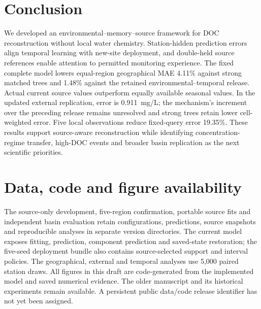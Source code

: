 \documentclass[11pt]{article}
\begin{document}
\section{Conclusion}
We developed an environmental--memory--source framework for DOC reconstruction without local water chemistry. Station-hidden prediction errors align temporal learning with new-site deployment, and double-held source references enable attention to permitted monitoring experience. The fixed complete model lowers equal-region geographical MAE 4.11\% against strong matched trees and 1.48\% against the retained environmental--temporal release. Actual current source values outperform equally available seasonal values. In the updated external replication, error is 0.911~mg/L; the mechanism's increment over the preceding release remains unresolved and strong trees retain lower cell-weighted error. Five local observations reduce fixed-query error 19.35\%. These results support source-aware reconstruction while identifying concentration-regime transfer, high-DOC events and broader basin replication as the next scientific priorities.

\section*{Data, code and figure availability}
The source-only development, five-region confirmation, portable source fits and independent basin evaluation retain configurations, predictions, source snapshots and reproducible analyses in separate version directories. The current model exposes fitting, prediction, component prediction and saved-state restoration; the five-seed deployment bundle also contains source-selected support and interval policies. The geographical, external and temporal analyses use 5,000 paired station draws. All figures in this draft are code-generated from the implemented model and saved numerical evidence. The older manuscript and its historical experiments remain available. A persistent public data/code release identifier has not yet been assigned.
\end{document}
